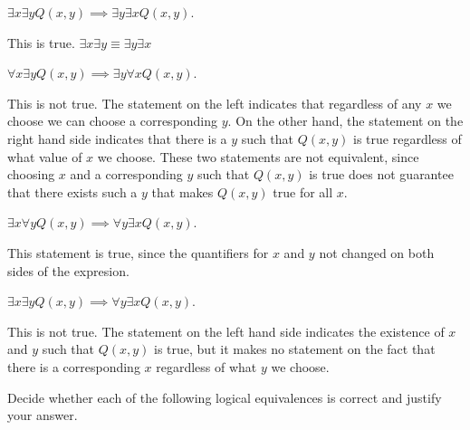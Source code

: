 \documentclass[11pt]{article}
\begin{document}
\begin{Parts}

\item
$\exists x \exists y Q(x,y) \implies \exists y \exists x Q(x,y)$.

\begin{solution}
    This is true. $\exists x \exists y \equiv \exists y \exists x$
\end{solution}
    

\item
$\forall x \exists y Q(x,y) \implies \exists y\forall x Q(x,y)$.
    
\begin{solution}
    This is not true. The statement on the left indicates that regardless of any $x$ we choose we can choose a corresponding $y$. On the other hand, the statement on the right hand side indicates that there is a $y$ such that $Q(x, y)$ is true regardless of what value of $x$ we choose. These two statements are not equivalent, since choosing $x$ and a corresponding $y$ such that $Q(x, y)$ is true does not guarantee that there exists such a $y$ that makes $Q(x, y)$ true for all $x$.
\end{solution}

\item
$\exists x \forall y Q(x,y) \implies \forall y \exists x Q(x,y)$.

\begin{solution}
    This statement is true, since the quantifiers for $x$ and $y$ not changed on both sides of the expresion.
\end{solution}
    

\item
$\exists x \exists y Q(x,y) \implies \forall y \exists x Q(x,y)$.

\begin{solution}
    This is not true. The statement on the left hand side indicates the existence of $x$ and $y$ such that $Q(x, y)$ is true, but it makes no statement on the fact that there is a corresponding $x$ regardless of what $y$ we choose. 
\end{solution}
    

\end{Parts}


Decide whether each of the following logical equivalences is correct and justify your answer. 
\end{document}
